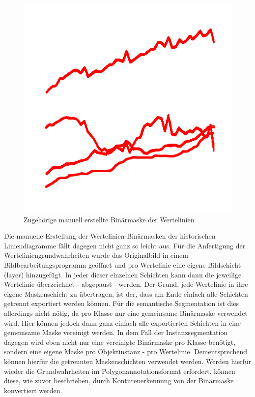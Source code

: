 \begin{figure}[H]
\begin{minipage}{0.475\textwidth}
        \includegraphics[width=\linewidth]{Methodik/img/lines_historical_mask.png}
        \caption{ Zugehörige manuell erstellte Binärmaske der Wertelinien}
        \label{fig:lines_historical_mask}
    \end{minipage}
\end{figure}

Die manuelle Erstellung der Wertelinien-Binärmasken der historischen Liniendiagramme fällt dagegen nicht ganz so leicht aus. Für die Anfertigung der Werteliniengrundwahrheiten wurde das Originalbild in einem Bildbearbeitungsprogramm \cite{photopea} geöffnet und pro Wertelinie eine eigene Bildschicht (layer) hinzugefügt. In jeder dieser einzelnen Schichten kann dann die jeweilige Wertelinie überzeichnet - abgepaust - werden. Der Grund, jede Wertelinie in ihre eigene Maskenschicht zu übertragen, ist der, dass am Ende einfach alle Schichten getrennt exportiert werden können. Für die semantische Segmentation ist dies allerdings nicht nötig, da pro Klasse nur eine gemeinsame Binärmaske verwendet wird. Hier können jedoch dann ganz einfach alle exportierten Schichten in eine gemeinsame Maske vereinigt werden. In dem Fall der Instanzsegmentation dagegen wird eben nicht nur eine vereinigte Binärmaske pro Klasse benötigt, sondern eine eigene Maske pro Objektinstanz - pro Wertelinie. Dementsprechend können hierfür die getrennten Maskenschichten verwendet werden. Werden hierfür wieder die Grundwahrheiten im Polygonannotationsformat erfordert, können diese, wie zuvor beschrieben, durch Konturenerkennung von der Binärmaske konvertiert werden.